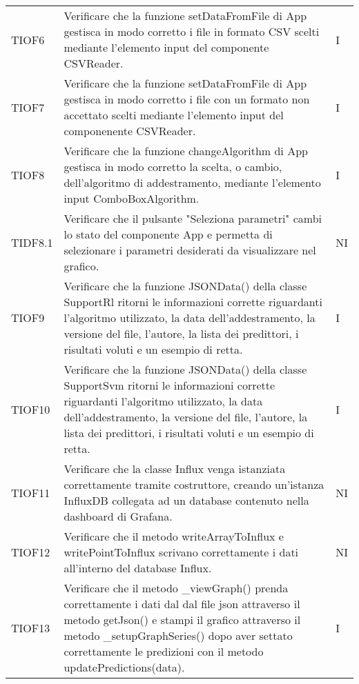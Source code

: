 \begin{longtable}{C{2cm} L{8cm} C{2cm}}
TIOF6 & Verificare che la funzione setDataFromFile di App gestisca in modo corretto i file in formato CSV scelti mediante l’elemento input del componente CSVReader. & I \\
TIOF7 & Verificare che la funzione setDataFromFile di App gestisca in modo corretto i file con un formato non accettato scelti mediante l’elemento input del componenente CSVReader. & I \\
TIOF8 & Verificare che la funzione changeAlgorithm di App gestisca in modo corretto la scelta, o cambio, dell'algoritmo di addestramento, mediante l'elemento input ComboBoxAlgorithm. & I \\
TIDF8.1 & Verificare che il pulsante "Seleziona parametri" cambi lo stato del componente App e permetta di selezionare i parametri desiderati da visualizzare nel grafico. & NI \\
TIOF9 & Verificare che la funzione JSONData() della classe SupportRl ritorni le informazioni corrette riguardanti l'algoritmo utilizzato, la data dell'addestramento, la versione del file, l'autore, la lista dei predittori, i risultati voluti e un esempio di retta. & I \\
TIOF10 & Verificare che la funzione JSONData() della classe SupportSvm ritorni le informazioni corrette riguardanti l'algoritmo utilizzato, la data dell'addestramento, la versione del file, l'autore, la lista dei predittori, i risultati voluti e un esempio di retta. & I \\
TIOF11 & Verificare che la classe Influx venga istanziata correttamente tramite costruttore, creando un’istanza InfluxDB collegata ad un database contenuto nella dashboard di Grafana. & NI \\
TIOF12 & Verificare che il metodo writeArrayToInflux e writePointToInflux scrivano correttamente i dati all'interno del database Influx. & NI \\
TIOF13 & Verificare che il metodo \_viewGraph() prenda correttamente i dati dal dal file json attraverso il metodo getJson() e stampi il grafico attraverso il metodo \_setupGraphSeries() dopo aver settato correttamente le predizioni con il metodo updatePredictions(data). & I \\
\end{longtable}

